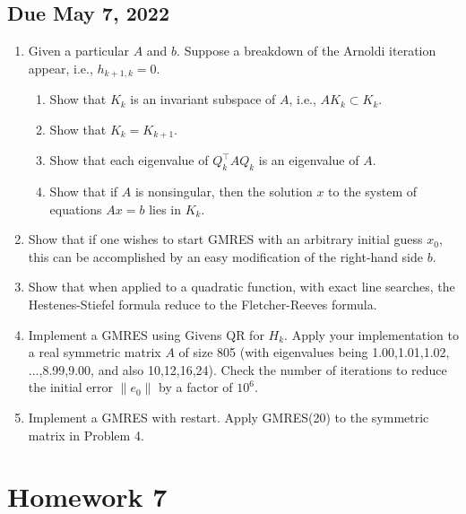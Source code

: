 \subsection*{Due May 7, 2022}
\begin{enumerate}[label=\textbf{Problem \arabic*.}]
    \item [30 pt] Given a particular \(A\) and \(b\). Suppose a breakdown of the Arnoldi iteration appear, i.e., \(h_{k+1,k}=0\).
    \begin{enumerate}
        \item Show that \(K_{k}\) is an invariant subspace of \(A\), i.e., \(AK_{k}\subset K_{k}\).
        \item Show that \(K_{k}=K_{k+1}\).
        \item Show that each eigenvalue of \(Q^{\top}_{k}AQ_{k}\) is an eigenvalue of \(A\).
        \item Show that if \(A\) is nonsingular, then the solution \(x\) to the system of equations \(Ax=b\) lies in \(K_{k}\).
    \end{enumerate}
    \item [10 pt] Show that if one wishes to start GMRES with an arbitrary initial guess \(x_{0}\), this can be accomplished by an easy modification of the right-hand side \(b\).
    \item [15 pt] Show that when applied to a quadratic function, with exact line searches, the Hestenes-Stiefel formula reduce to the Fletcher-Reeves formula.
    \item [25 pt] Implement a GMRES using Givens QR for \(H_{k}\). Apply your implementation to a real symmetric matrix \(A\) of size 805 (with eigenvalues being 1.00,1.01,1.02,\(\ldots\),8.99,9.00, and also 10,12,16,24). Check the number of iterations to reduce the initial error \(\|e_{0}\|\) by a factor of \(10^{6}\).
    \item [10 pt] Implement a GMRES with restart. Apply GMRES(20) to the symmetric matrix in Problem 4.
\end{enumerate}

\section{Homework 7}
